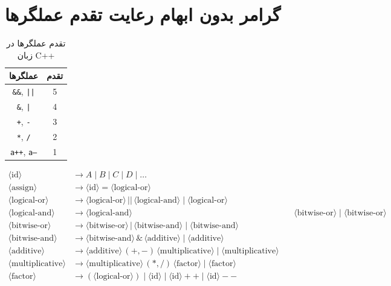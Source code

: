 \documentclass{article}
\begin{document}
\section*{گرامر بدون ابهام رعایت تقدم عملگر‌ها}

\begin{table}[h!]
    \centering
    \begin{tabular}{|c|c|}
        \hline
        \textbf{عملگرها} & \textbf{تقدم} \\
        \hline
        \texttt{\&\&}, \texttt{||} & 5 \\
        \hline
        \texttt{\&}, \texttt{|} & 4 \\
        \hline
        \texttt{+}, \texttt{-} & 3 \\
        \hline
        \texttt{*}, \texttt{/} & 2 \\
        \hline
        \texttt{a++}, \texttt{a--} & 1 \\
        \hline
    \end{tabular}
    \caption{تقدم عملگرها در زبان C++}
    \label{tab:operator_precedence}
\end{table}

\begin{align*}
\langle \text{id} \rangle &\to A \mid B \mid C \mid D \mid \dots \\
\langle \text{assign} \rangle &\to \langle \text{id} \rangle = \langle \text{logical-or} \rangle \\
\langle \text{logical-or} \rangle &\to \langle \text{logical-or} \rangle \, || \, \langle \text{logical-and} \rangle \mid \langle \text{logical-or} \rangle \\
\langle \text{logical-and} \rangle &\to \langle \text{logical-and} \rangle \, && \, \langle \text{bitwise-or} \rangle \mid \langle \text{bitwise-or} \rangle \\
\langle \text{bitwise-or} \rangle &\to \langle \text{bitwise-or} \rangle \, | \, \langle \text{bitwise-and} \rangle \mid \langle \text{bitwise-and} \rangle \\
\langle \text{bitwise-and} \rangle &\to \langle \text{bitwise-and} \rangle \, \& \, \langle \text{additive} \rangle \mid \langle \text{additive} \rangle \\
\langle \text{additive} \rangle &\to \langle \text{additive} \rangle \, (+, -) \, \langle \text{multiplicative} \rangle \mid \langle \text{multiplicative} \rangle \\
\langle \text{multiplicative} \rangle &\to \langle \text{multiplicative} \rangle \, (*, /) \, \langle \text{factor} \rangle \mid \langle \text{factor} \rangle \\
\langle \text{factor} \rangle &\to (\langle \text{logical-or} \rangle) \mid \langle \text{id} \rangle \mid \langle \text{id} \rangle++ \mid \langle \text{id} \rangle--
\end{align*}
\end{document}
